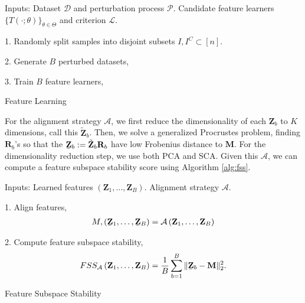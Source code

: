 \begin{algorithm}[H]
\SetAlgoLined
{}
Inputs: Dataset $\mathcal{D}$ and perturbation process $\mathcal{P}$. Candidate
feature learners $\{T\left(\cdot; \theta\right)\}_{\theta \in \Theta}$ and
criterion $\mathcal{L}$.

1. Randomly split samples into disjoint subsets $I, I^{C} \subset \left[n\right]$.

2. Generate $B$ perturbed datasets,


3. Train $B$ feature learners,

\caption{Feature Learning}
\label{alg:features}
\end{algorithm}

For the alignment strategy $\mathcal{A}$, we first reduce the dimensionality of
each $\mathbf{Z}_{b}$ to $K$ dimensions, call this $\tilde{\mathbf{Z}}_{b}$.
Then, we solve a generalized Procrustes problem, finding $\mathbf{R}_{b}$'s so
that the $\underaccent{\bar}{\mathbf{Z}}_{b} :=
\tilde{\mathbf{Z}}_{b}\mathbf{R}_{b}$ have low Frobenius distance to
$\mathbf{M}$. For the dimensionality reduction step, we use both PCA and SCA.
Given this $\mathcal{A}$, we can compute a feature subspace stability score
using Algorithm \ref{alg:fss}.

\begin{algorithm}[H]
  \SetAlgoLined
  Inputs: Learned features $\left(\mathbf{Z}_{1}, \dots, \mathbf{Z}_{B}\right)$.
  Alignment strategy $\mathcal{A}$.

  1. Align features,
  \begin{align*}
    M, \left(\underaccent{\bar}{\mathbf{Z}}_{1}, \dots, \underaccent{\bar}{\mathbf{Z}}_{B}\right) = \mathcal{A}\left(\mathbf{Z}_{1}, \dots, \mathbf{Z}_{B}\right)
  \end{align*}

  2. Compute feature subspace stability,
  \begin{align*}
    FSS_{\mathcal{A}}\left(\mathbf{Z}_{1}, \dots, \mathbf{Z}_{B}\right) = \frac{1}{B} \sum_{b = 1}^{B} \|\underaccent{\bar}{\mathbf{Z}}_{b} - \mathbf{M}\|^{2}_{2}.
  \end{align*}
  \caption{Feature Subspace Stability}
  \label{alg:fss}
\end{algorithm}

